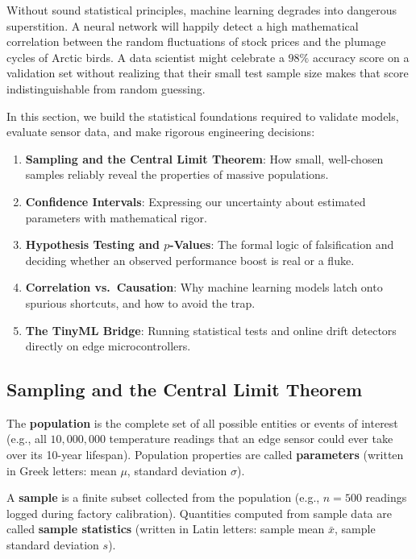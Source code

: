 Without sound statistical principles, machine learning degrades into dangerous superstition. A neural network will happily detect a high mathematical correlation between the random fluctuations of stock prices and the plumage cycles of Arctic birds. A data scientist might celebrate a $98\%$ accuracy score on a validation set without realizing that their small test sample size makes that score indistinguishable from random guessing.

In this section, we build the statistical foundations required to validate models, evaluate sensor data, and make rigorous engineering decisions:
\begin{enumerate}
    \item \textbf{Sampling and the Central Limit Theorem}: How small, well-chosen samples reliably reveal the properties of massive populations.
    \item \textbf{Confidence Intervals}: Expressing our uncertainty about estimated parameters with mathematical rigor.
    \item \textbf{Hypothesis Testing and $p$-Values}: The formal logic of falsification and deciding whether an observed performance boost is real or a fluke.
    \item \textbf{Correlation vs.\ Causation}: Why machine learning models latch onto spurious shortcuts, and how to avoid the trap.
    \item \textbf{The TinyML Bridge}: Running statistical tests and online drift detectors directly on edge microcontrollers.
\end{enumerate}

\subsection{Sampling and the Central Limit Theorem}\label{subsec:stat_sampling_clt}

\begin{keyidea}
The \textbf{population} is the complete set of all possible entities or events of interest (e.g., all $10{,}000{,}000$ temperature readings that an edge sensor could ever take over its 10-year lifespan). Population properties are called \textbf{parameters} (written in Greek letters: mean $\mu$, standard deviation $\sigma$).

A \textbf{sample} is a finite subset collected from the population (e.g., $n = 500$ readings logged during factory calibration). Quantities computed from sample data are called \textbf{sample statistics} (written in Latin letters: sample mean $\bar{x}$, sample standard deviation $s$).
\end{keyidea}

